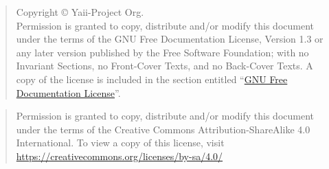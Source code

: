 \newpage\thispagestyle{empty}
\begin{quote}\footnotesize
    Copyright \copyright{} {\the\year} Yaii-Project Org. \\
    Permission is granted to copy, distribute and/or modify this document
    under the terms of the GNU Free Documentation License, Version 1.3
    or any later version published by the Free Software Foundation;
    with no Invariant Sections, no Front-Cover Texts, and no Back-Cover Texts.
    A copy of the license is included in the section entitled ``\hyperref[label_fdl]{GNU
    Free Documentation License}''.
\end{quote}

\begin{quote}\footnotesize
    Permission is granted to copy, distribute and/or modify this document
    under the terms of the Creative Commons Attribution-ShareAlike 4.0 International. To view a copy of this license, visit \url{https://creativecommons.org/licenses/by-sa/4.0/}
\end{quote}

\endinput
